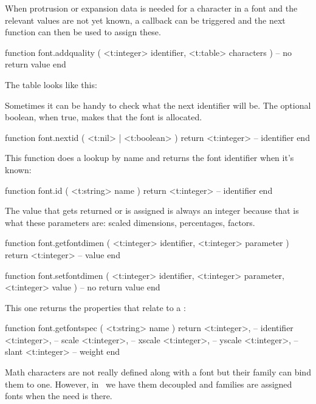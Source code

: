 When protrusion or expansion data is needed for a character in a font and the
relevant values are not yet known, a callback can be triggered and the next function
can then be used to assign these.

\starttyping [option=LUA]
function font.addquality (
    <t:integer> identifier,
    <t:table>   characters
)
    -- no return value
end
\stoptyping

The table looks like this:

\stoptyping

Sometimes it can be handy to check what the next identifier will be. The optional
boolean, when true, makes that the font is allocated.

\starttyping [option=LUA]
function font.nextid ( <t:nil> | <t:boolean> )
    return <t:integer> -- identifier
end
\stoptyping

This function does a lookup by name and returns the font identifier when it's
known:

\starttyping [option=LUA]
function font.id ( <t:string> name )
    return <t:integer> -- identifier
end
\stoptyping

The value that gets returned or is assigned is always an integer because that is
what these parameters are: scaled dimensions, percentages, factors.

\starttyping [option=LUA]
function font.getfontdimen (
    <t:integer> identifier,
    <t:integer> parameter
)
    return <t:integer> -- value
end
\stoptyping

\starttyping [option=LUA]
function font.setfontdimen (
    <t:integer> identifier,
    <t:integer> parameter,
    <t:integer> value
)
    -- no return value
end
\stoptyping

This one returns the properties that relate to a \type {\fontspecdef}:

\starttyping [option=LUA]
function font.getfontspec ( <t:string> name )
    return
        <t:integer>, -- identifier
        <t:integer>, -- scale
        <t:integer>, -- xscale
        <t:integer>, -- yscale
        <t:integer>, -- slant
        <t:integer>  -- weight
end
\stoptyping

Math characters are not really defined along with a font but their family can
bind them to one. However, in \CONTEXT\ we have them decoupled and families are
assigned fonts when the need is there.

